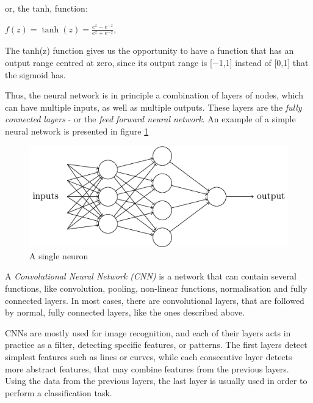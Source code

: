 \documentclass[final,12p,times]{elsarticle}
\begin{document}
or, the tanh, function:


\begin{math}f(z) = \tanh(z) = \frac{e^z - e^{-z}}{e^z + e^{-z}}\end{math}, 
 

The tanh(z) function gives us the opportunity to have a function that has an output range centred at zero, since its output range is [−1,1] instead of [0,1] that the sigmoid has.

Thus, the neural network is in principle a combination of layers of nodes, which can have multiple inputs, as well as multiple outputs.
These layers are the \emph{fully connected layers} - or the \emph{feed forward neural network}.
An example of a simple neural network is presented in figure \ref{fig:Fig2.2}

\begin{figure}[H]
  \includegraphics[width=1.0\textwidth, center]{NN.png}
  \caption{A single neuron}
  \label{fig:Fig2.2}
  \end{figure}


A \emph{Convolutional Neural Network (CNN)} is a network that can contain several functions, like convolution, pooling, non-linear functions, normalisation and fully connected layers. 
In most cases, there are convolutional layers, that are followed by normal, fully connected layers, like the ones described above.

CNNs are mostly used for image recognition, and each of their layers acts in practice as a filter, detecting specific features, or patterns.
The first layers detect simplest features such as lines or curves, while each consecutive layer detects more abstract features, that may combine features from the previous layers.
Using the data from the previous layers, the last layer is usually used in order to perform a classification task.
\end{document}
